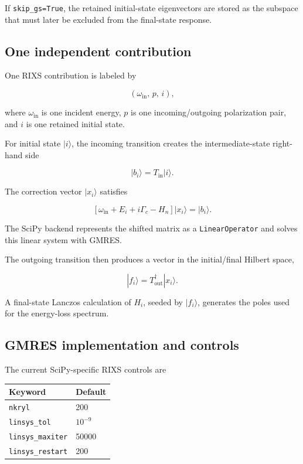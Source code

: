 \documentclass[11pt]{article}
\begin{document}
If \texttt{skip\_gs=True}, the retained initial-state eigenvectors are stored as the subspace that must later be excluded from the final-state response.

\subsection{One independent contribution}

One RIXS contribution is labeled by

\begin{equation}
  (\omega_{\mathrm{in}},\,p,\,i),
\end{equation}

where \(\omega_{\mathrm{in}}\) is one incident energy, \(p\) is one incoming/outgoing polarization pair, and \(i\) is one retained initial state.

For initial state \(|i\rangle\), the incoming transition creates the intermediate-state right-hand side

\begin{equation}
  |b_i\rangle=T_{\mathrm{in}}|i\rangle.
\end{equation}

The correction vector \(|x_i\rangle\) satisfies

\begin{equation}
  \left[
  \omega_{\mathrm{in}} + E_i + i\Gamma_c - H_n
  \right]|x_i\rangle
  = |b_i\rangle.
\end{equation}

The SciPy backend represents the shifted matrix as a \texttt{LinearOperator} and solves this linear system with GMRES.

The outgoing transition then produces a vector in the initial/final Hilbert space,

\begin{equation}
  |f_i\rangle = T_{\mathrm{out}}^\dagger |x_i\rangle.
\end{equation}

A final-state Lanczos calculation of \(H_i\), seeded by \(|f_i\rangle\), generates the poles used for the energy-loss spectrum.

\subsection{GMRES implementation and controls}

The current SciPy-specific RIXS controls are

\begin{center}
\begin{tabular}{ll}
\toprule
Keyword & Default \\
\midrule
\texttt{nkryl} & 200 \\
\texttt{linsys\_tol} & \(10^{-9}\) \\
\texttt{linsys\_maxiter} & 50000 \\
\texttt{linsys\_restart} & 200 \\
\bottomrule
\end{tabular}
\end{center}
\end{document}
